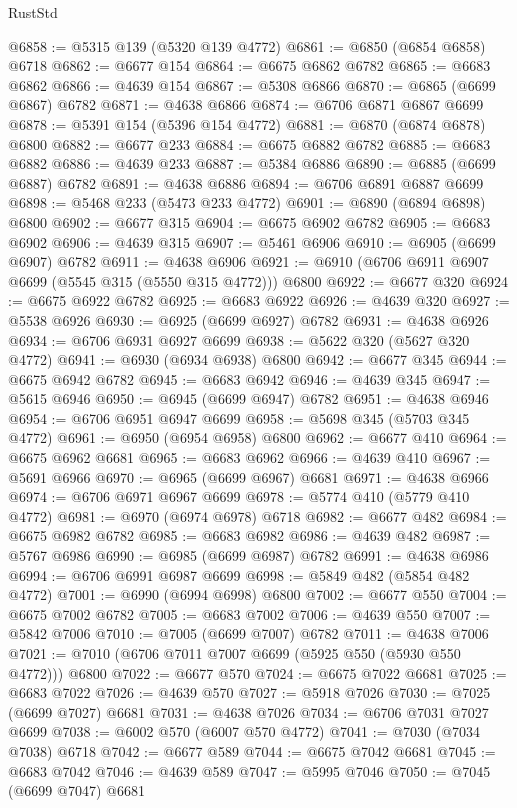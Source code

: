 \begin{lexlean}{RustStd}
\begin{coremodule}
@6858 := @5315 @139 (@5320 @139 @4772)
@6861 := @6850 (@6854 @6858) @6718
@6862 := @6677 @154
@6864 := @6675 @6862 @6782
@6865 := @6683 @6862
@6866 := @4639 @154
@6867 := @5308 @6866
@6870 := @6865 (@6699 @6867) @6782
@6871 := @4638 @6866
@6874 := @6706 @6871 @6867 @6699
@6878 := @5391 @154 (@5396 @154 @4772)
@6881 := @6870 (@6874 @6878) @6800
@6882 := @6677 @233
@6884 := @6675 @6882 @6782
@6885 := @6683 @6882
@6886 := @4639 @233
@6887 := @5384 @6886
@6890 := @6885 (@6699 @6887) @6782
@6891 := @4638 @6886
@6894 := @6706 @6891 @6887 @6699
@6898 := @5468 @233 (@5473 @233 @4772)
@6901 := @6890 (@6894 @6898) @6800
@6902 := @6677 @315
@6904 := @6675 @6902 @6782
@6905 := @6683 @6902
@6906 := @4639 @315
@6907 := @5461 @6906
@6910 := @6905 (@6699 @6907) @6782
@6911 := @4638 @6906
@6921 := @6910 (@6706 @6911 @6907 @6699 (@5545 @315 (@5550 @315 @4772))) @6800
@6922 := @6677 @320
@6924 := @6675 @6922 @6782
@6925 := @6683 @6922
@6926 := @4639 @320
@6927 := @5538 @6926
@6930 := @6925 (@6699 @6927) @6782
@6931 := @4638 @6926
@6934 := @6706 @6931 @6927 @6699
@6938 := @5622 @320 (@5627 @320 @4772)
@6941 := @6930 (@6934 @6938) @6800
@6942 := @6677 @345
@6944 := @6675 @6942 @6782
@6945 := @6683 @6942
@6946 := @4639 @345
@6947 := @5615 @6946
@6950 := @6945 (@6699 @6947) @6782
@6951 := @4638 @6946
@6954 := @6706 @6951 @6947 @6699
@6958 := @5698 @345 (@5703 @345 @4772)
@6961 := @6950 (@6954 @6958) @6800
@6962 := @6677 @410
@6964 := @6675 @6962 @6681
@6965 := @6683 @6962
@6966 := @4639 @410
@6967 := @5691 @6966
@6970 := @6965 (@6699 @6967) @6681
@6971 := @4638 @6966
@6974 := @6706 @6971 @6967 @6699
@6978 := @5774 @410 (@5779 @410 @4772)
@6981 := @6970 (@6974 @6978) @6718
@6982 := @6677 @482
@6984 := @6675 @6982 @6782
@6985 := @6683 @6982
@6986 := @4639 @482
@6987 := @5767 @6986
@6990 := @6985 (@6699 @6987) @6782
@6991 := @4638 @6986
@6994 := @6706 @6991 @6987 @6699
@6998 := @5849 @482 (@5854 @482 @4772)
@7001 := @6990 (@6994 @6998) @6800
@7002 := @6677 @550
@7004 := @6675 @7002 @6782
@7005 := @6683 @7002
@7006 := @4639 @550
@7007 := @5842 @7006
@7010 := @7005 (@6699 @7007) @6782
@7011 := @4638 @7006
@7021 := @7010 (@6706 @7011 @7007 @6699 (@5925 @550 (@5930 @550 @4772))) @6800
@7022 := @6677 @570
@7024 := @6675 @7022 @6681
@7025 := @6683 @7022
@7026 := @4639 @570
@7027 := @5918 @7026
@7030 := @7025 (@6699 @7027) @6681
@7031 := @4638 @7026
@7034 := @6706 @7031 @7027 @6699
@7038 := @6002 @570 (@6007 @570 @4772)
@7041 := @7030 (@7034 @7038) @6718
@7042 := @6677 @589
@7044 := @6675 @7042 @6681
@7045 := @6683 @7042
@7046 := @4639 @589
@7047 := @5995 @7046
@7050 := @7045 (@6699 @7047) @6681

\end{coremodule}
\end{lexlean}
